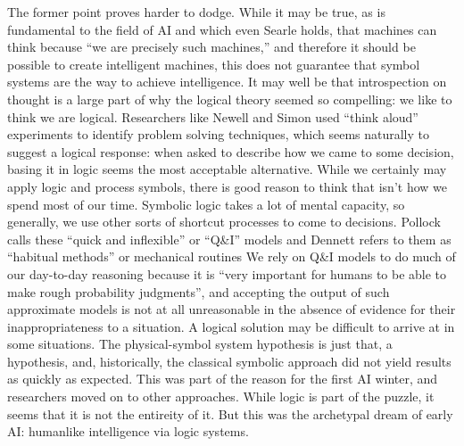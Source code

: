 The former point proves harder to dodge. While it may be true, as is
fundamental to the field of AI and which even Searle holds, that
machines can think because ``we are precisely such machines,''\cite[p.
83]{chineseSearle} and therefore it should be possible to create
intelligent machines, this does not guarantee that symbol systems are
the way to achieve intelligence. It may well be that introspection on
thought is a large part of why the logical theory seemed so
compelling: we like to think we are logical. Researchers like Newell
and Simon used ``think aloud'' experiments to identify problem solving
techniques,\cite[Ch. 10]{mccorduck} which seems naturally to suggest a logical response: when
asked to describe how we came to some decision, basing it in logic
seems the most acceptable alternative. While we certainly may apply logic
and process symbols, there is good reason to think that isn't how we
spend most of our time. Symbolic logic takes a lot of mental capacity,
so generally, we use other sorts of shortcut processes to come to
decisions. Pollock calls these ``quick and inflexible'' or ``Q\&I''
models\cite[p. 120]{pollock} and Dennett refers to them as ``habitual methods'' or
mechanical routines\cite[p. 157]{dennett} We rely on Q\&I models to do
much of our day-to-day reasoning because it is ``very important for
humans to be able to make rough probability judgments''\cite[p.
  120]{pollock}, and accepting the output of such approximate models
is not at all unreasonable in the absence of evidence for their
inappropriateness to a situation. A logical solution may be difficult
to arrive at in some situations. The physical-symbol system hypothesis
is just that, a hypothesis, and, historically, the classical symbolic
approach did not yield results as quickly as expected. This was part
of the reason for the first AI winter, and researchers moved on to
other approaches. While logic is part of the puzzle, it seems that it
is not the entireity of it. But this was the archetypal dream of early
AI: humanlike intelligence via logic systems.

